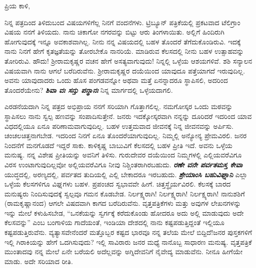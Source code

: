 \noindent
ಪ್ರಿಯ ಕಾಳಿ,

ನಿನ್ನ ಪತ್ರದಿಂದ ತಿಳಿದುಬಂದ ವಿಷಯಗಳಿಗೆಲ್ಲ ನಿನಗೆ ವಂದನೆಗಳು. ಟ್ರಿಬ್ಯೂನ್ ಪತ್ರಿಕೆಯಲ್ಲಿ ಪ್ರಕಟವಾದ ಟೆಲಿಗ್ರಾಂ ವಿಷಯ ನನಗೆ ತಿಳಿಯದು. ನಾನು ಚಿಕಾಗೋ ನಗರವನ್ನು ಬಿಟ್ಟು ಆರು ತಿಂಗಳಾಯಿತು. ಅಲ್ಲಿಗೆ ಹಿಂದಿರುಗಿ ಹೋಗುವುದಕ್ಕೆ ಇನ್ನೂ ಅವಕಾಶವಾಗಿಲ್ಲ. ನೀನು ನನ್ನ ವಿಷಯದಲ್ಲಿ ಬಹಳ ತೊಂದರೆ ತೆಗೆದುಕೊಂಡಿರುವಿ. ಇದಕ್ಕೆ ನಾನು ನಿನಗೆ ಹೇಗೆ ಕೃತಜ್ಞತೆಯನ್ನು ತೋರಬೇಕೊ ನಾನರಿಯೆ. ಮಾಡಿರುವ ಕೆಲಸದಲ್ಲಿ ನೀನು ಬಹಳ ಉತ್ಸಾಹವನ್ನು ತೋರಿರುವಿ. ಹೌದು! ಶ‍್ರೀರಾಮಕೃಷ್ಣರ ವಚನ ಹೇಗೆ ಅಸತ್ಯವಾಗುವುದು! ನಿನ್ನಲ್ಲಿ ಒಳ್ಳೆಯ ಆಶಯಗಳಿವೆ. ಶಶಿ ಸನ್ಯಾಲನ ವಿಷಯವಾಗಿ ನಾನು ಆಗಲೆ ಬರೆದಿರುವೆನು. ಶ‍್ರೀರಾಮಕೃಷ್ಣರ ದಯೆಯಿಂದ ಯಾವುದೂ ಪತ್ತೆಯಾಗದೆ ಇರುವುದಿಲ್ಲ. ಅವನು ಯಾವುದಾದರು ಒಂದು ಹೊಸ ಪಂಗಡವನ್ನೋ ಅಥವಾ ಮತ್ತೆ ಏನನ್ನಾದರೂ ಸ್ಥಾಪಿಸಲಿ, ಅದರಿಂದ ತೊಂದರೆಯೇನು? \textbf{\textit{ಶಿವಾ ವಃ ಸನ್ತು ಪನ್ಥಾನಃ}} ನಿನ್ನ ಮಾರ್ಗದಲ್ಲಿ ಒಳ್ಳೆಯದಾಗಲಿ.

ಎರಡನೆಯದಾಗಿ ನಿನ್ನ ಪತ್ರದ ಅಭಿಪ್ರಾಯ ನನಗೆ ಸರಿಯಾಗಿ ಗೊತ್ತಾಗಲಿಲ್ಲ. ನಮಗೋಸ್ಕರ ಒಂದು ಮಠವನ್ನು ಸ್ಥಾಪಿಸಲು ನಾನು ಸ್ವಲ್ಪ ಹಣವನ್ನು ಸಂಪಾದಿಸುತ್ತೇನೆ. ಜನರು ಇದಕ್ಕೋಸ್ಕರವಾಗಿ ನನ್ನನ್ನು ದೂರಿದರೆ ಇದರಿಂದ ಯಾವ ವಿಧದಲ್ಲಿಯೂ ಏನೂ ಪರಿಣಾಮವಾಗುವುದಿಲ್ಲ. ಬಹಳ ಉತ್ತಮವಾದ ಜೀವನಕ್ಕೆ ನಿನ್ನ ಜೀವನವನ್ನು ಅರ್ಪಿಸು. ಚಂಚಲಚಿತ್ತನಾಗಬೇಡ. ಇದರಿಂದ ನಿನಗೆ ಏನೂ ತೊಂದರೆಯಾಗುವುದಿಲ್ಲ. ನಿಮ್ಮಲ್ಲಿ ಅನ್ಯೋನ್ಯ ಪ್ರೇಮವಿರಲಿ. ಜನರ ನಿಂದನೆಗೆ ಮನಗೊಡದೆ ಇದ್ದರೆ ಸಾಕು. ಕಾಳಿಕೃಷ್ಣ ಬಾಬುವಿಗೆ ಕೆಲಸದಲ್ಲಿ ಬಹಳ ಪ್ರೀತಿ ಇದೆ. ಅವನು ಒಳ್ಳೆಯ ಮನುಷ್ಯ. ನನ್ನ ವಿಶೇಷ ಪ್ರೀತಿಯನ್ನು ಅವನಿಗೆ ತಿಳಿಸು. ಗುರುದೇವರ ದಯೆಯಿಂದ ನಿಮ್ಮಗಳಲ್ಲಿ ಎಲ್ಲಿಯವರೆವಿಗೂ ವಿರಸ ಉಂಟಾಗುವುದಿಲ್ಲವೋ ಅಲ್ಲಿಯವರೆವಿಗೂ ನೀವು ನಿಶ್ಚಿಂತರಾಗಿರಬಹುದು. \textbf{\textit{ರಣೇ ವನೇ ಪರ್ವತಮಸ್ತ ಕೇವಾ}} ಯುದ್ಧದಲ್ಲಿ, ಅರಣ್ಯದಲ್ಲಿ, ಪರ್ವತದ ತುದಿಯಲ್ಲಿ ಎಲ್ಲಿ ಬೇಕಾದರೂ ಇರಬಹುದು. \textbf{\textit{ಶ್ರೇಯಾಂಸಿ ಬಹುವಿಘ್ನಾನಿ\enginline{-}}} ಎಲ್ಲಾ ಒಳ್ಳೆಯ ಕೆಲಸಗಳಿಗೂ ವಿಘ್ನಗಳು ಬಹಳ. ಪ್ರಪಂಚದ ಸ್ವಭಾವವೇ ಹೀಗೆ. ಚಿತ್ತಸ್ಥೈರ್ಯವಿರಲಿ. ಕೆಲಸಕ್ಕೆ ಬಾರದ ಮನುಷ್ಯರು ನಿಂದಿಸುವುದಕ್ಕೆ ಸ್ವಲ್ಪವೂ ಗಮನ ಕೊಡಬೇಡ. ನಿರ್ಲಕ್ಷ್ಯರಾಗಿ! ನಿರ್ಲಕ್ಷ್ಯರಾಗಿ! ನಿರ್ಲಕ್ಷ್ಯರಾಗಿ! ನಾನು\enginline{-}ಶಶಿಗೆ (ರಾಮಕೃಷ್ಣಾನಂದ) ಆಗಲೇ ವಿಷದವಾಗಿ ಕಾಗದ ಬರೆದಿರುವೆನು. ವೃತ್ತಪತ್ರಿಕೆಗಳು ಮತ್ತು ಅವುಗಳ ಲೇಖನಗಳನ್ನು ಇನ್ನು ಮೇಲೆ ಕಳುಹಿಸಬೇಡ, “ಒನಕೆಯನ್ನು ಸ್ವರ್ಗಕ್ಕೆ ಕರೆದುಕೊಂಡು ಹೋದರೂ ಅದು ಅಲ್ಲಿ ಮಾಡುವುದು ಅದೇ ಕೆಲಸವನ್ನು” ಎಂಬ ಬಂಗಾಳಿಯ ಗಾದೆಯಂತೆ, ಇಂಡಿಯಾ ದೇಶದಲ್ಲಿ ನಾನು ಕಷ್ಟಪಡುತ್ತಿದ್ದಂತೆ ಇಲ್ಲಿಯೂ ಕಷ್ಟಪಡುತ್ತಿರುವೆನು. ವ್ಯತ್ಯಾಸವೇನೆಂದರೆ ಮತ್ತೊಬ್ಬರ ಕಷ್ಟದ ಭಾರವೂ ನನ್ನ ತಲೆಯ ಮೇಲೆ ಬಿದ್ದಿದೆ!ಜನರ ಪುಸ್ತಕಗಳಿಗೆ ಇಲ್ಲಿ ಗಿರಾಕಿಯನ್ನು ಹೇಗೆ ಒದಗಿಸುವುದು? ಇಲ್ಲಿ ಸಾವಿರಾರು ಜನರ ಮಧ್ಯೆ ನಾನೊಬ್ಬ ಸಾಧಾರಣ ಮನುಷ್ಯ. ವೃತ್ತಪತ್ರಿಕೆ ಮುಂತಾದವು ನನ್ನ ಮೇಲೆ ಏನೇ ಬರೆಯಲಿ ಅದೆಲ್ಲವನ್ನು ಅಗ್ನಿದೇವನಿಗೆ ನೈವೇದ್ಯ ಮಾಡುವೆನು. ನೀನೂ ಹೀಗೆಯೇ ಮಾಡು. ಅದೇ ಸರಿಯಾದ ರೀತಿ.


